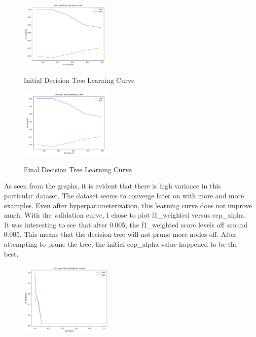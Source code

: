 \documentclass[conference]{IEEEtran}
\begin{document}
\begin{figure}[H]
    \centering
    \includegraphics[width=0.40\textwidth]{PIMA Indian Diabetes Graphs/Decision Trees/dt pima init.png}
    \label{fig:enter-label}
    \caption{Initial Decision Tree Learning Curve}
\end{figure}

\begin{figure}[H]
    \centering
    \includegraphics[width=0.40\textwidth]{PIMA Indian Diabetes Graphs/Decision Trees/dt pima final.png}
    \label{fig:enter-label}
    \caption{Final Decision Tree Learning Curve}
\end{figure}
    
As seen from the graphs, it is evident that there is high variance in this particular dataset. The dataset seems to converge later on with more and more examples. Even after hyperparameterization, this learning curve does not improve much. With the validation curve, I chose to plot f1\_weighted versus ccp\_alpha. It was interesting to see that after 0.005, the f1\_weighted score levels off around 0.005. This means that the decision tree will not prune more nodes off. After attempting to prune the tree, the initial ccp\_alpha value happened to be the best. 

\begin{figure}[H]
    \centering
    \includegraphics[width=0.40\textwidth]{PIMA Indian Diabetes Graphs/Decision Trees/dt val curve.png}
    \label{fig:enter-label}
\end{figure}
\end{document}
